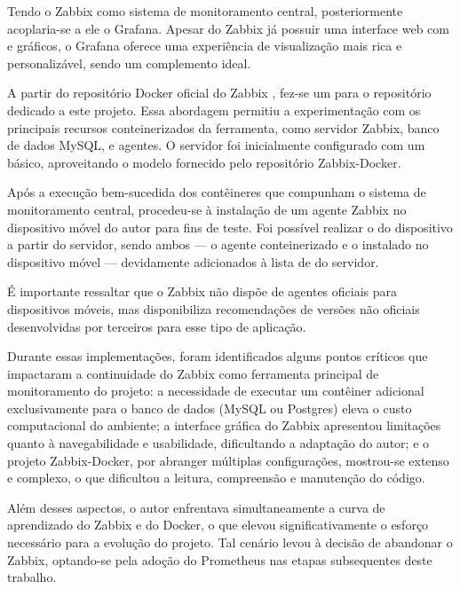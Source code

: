 Tendo o Zabbix como sistema de monitoramento central, posteriormente aco\-plaria-se a ele o Grafana. Apesar do Zabbix já possuir uma interface web com  e gráficos, o Grafana oferece uma experiência de visualização mais rica e personalizável, sendo um complemento ideal.

A partir do repositório Docker oficial do Zabbix  \citep{zabbixdocker2025}, fez-se um  para o repositório dedicado a este projeto. Essa abordagem permitiu a experimentação com os principais recursos conteinerizados da ferramenta, como servidor Zabbix, banco de dados MySQL, e agentes. O servidor foi inicialmente configurado com um  básico, aproveitando o modelo fornecido pelo repositório Zabbix-Docker.

Após a execução bem-sucedida dos contêineres que compunham o sistema de monitoramento central, procedeu-se à instalação de um agente Zabbix no dispositivo móvel do autor para fins de teste. Foi possível realizar o  do dispositivo a partir do servidor, sendo ambos --- o agente conteinerizado e o instalado no dispositivo móvel --- devidamente adicionados à lista de  do servidor.

É importante ressaltar que o Zabbix não dispõe de agentes oficiais para dispositivos móveis, mas disponibiliza recomendações de versões não oficiais desenvolvidas por terceiros para esse tipo de aplicação.

Durante essas implementações, foram identificados alguns pontos críticos que impactaram a continuidade do Zabbix como ferramenta principal de monitoramento do projeto: a necessidade de executar um contêiner adicional exclusivamente para o banco de dados (MySQL ou Postgres) eleva o custo computacional do ambiente; a interface gráfica do Zabbix apresentou limitações quanto à navegabilidade e usabilidade, dificultando a adaptação do autor; e o projeto Zabbix-Docker, por abranger múltiplas configurações, mostrou-se extenso e complexo, o que dificultou a leitura, compreensão e manutenção do código.

Além desses aspectos, o autor enfrentava simultaneamente a curva de aprendizado do Zabbix e do Docker, o que elevou significativamente o esforço necessário para a evolução do projeto. Tal cenário levou à decisão de abandonar o Zabbix, optando-se pela adoção do Prometheus nas etapas subsequentes deste trabalho.

